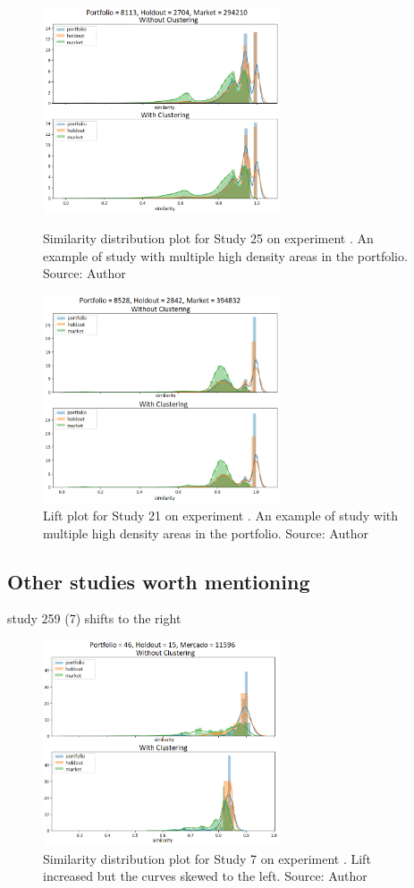 \begin{figure}[h]
   \centering
   \includegraphics[width=7cm]{fig/ch4-bump-study-25.png}
   \caption{Similarity distribution plot for Study 25 on experiment \nameExperimentII{}. An example of study with multiple high density areas in the portfolio. Source: Author}
   \label{fig:bump-study-25}

   \includegraphics[width=7cm]{fig/ch4-bump-study-21.png}
   \caption{Lift plot for Study 21 on experiment \nameExperimentII{}. An example of study with multiple high density areas in the portfolio. Source: Author}
   \label{fig:bump-study-21}
\end{figure}

\subsection{Other studies worth mentioning}

study 259 (7) shifts to the right

\begin{figure}[h]
   \centering
   \includegraphics[width=7cm]{fig/ch4-worth-mentioning-study-7.png}
   \caption{Similarity distribution plot for Study 7 on experiment \nameExperimentII{}. Lift increased but the curves skewed to the left. Source: Author}
   \label{fig:worth-mentioning-study-7}
\end{figure}


